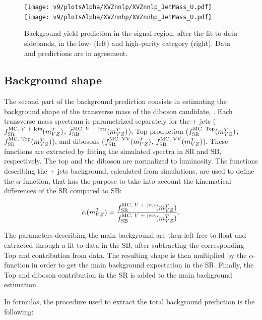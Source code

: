 \begin{figure}[!htb]
  \centering
    \texttt{[image: v9/plotsAlpha/XVZnnlp/XVZnnlp\_JetMass\_U.pdf]}
    \texttt{[image: v9/plotsAlpha/XVZnnhp/XVZnnhp\_JetMass\_U.pdf]}
  \caption{Background yield prediction in the signal region, after the fit to data sidebands, in the low- (left) and high-purity category (right). Data and predictions are in agreement.}
  \label{fig:XVZnn_JetMass}
\end{figure}








\subsection{Background shape}\label{ssec:alphaShape}

The second part of the background prediction consists in estimating the background shape of the transverse mass of the diboson candidate, \mtVZ. Each transverse mass spectrum is parametrized separately for the \V + jets ($f_{\text{SR}}^{\text{MC, \V + jets}}(\mtVZ)$, $f_{\text{SB}}^{\text{MC, \V + jets}}(\mtVZ)$), Top production ($f_{\text{SR}}^{\text{MC, Top}}(m_{VZ}^T)$, $f_{\text{SB}}^{\text{MC, Top}}(m_{VZ}^T)$), and dibosons ($f_{\text{SR}}^{\text{MC, VV}}(m_{VZ}^T)$, $f_{\text{SB}}^{\text{MC, VV}}(m_{VZ}^T)$). These functions are extracted by fitting the simulated \mtVZ spectra in SR and SB, respectively. The top and the diboson are normalized to luminosity. The functions describing the \V + jets background, calculated from simulations, are used to define the $\alpha$-function, that has the purpose to take into account the kinematical differences of the SR compared to SB:

\begin{equation}
\alpha(\mtVZ) = \frac{f_{\text{SR}}^{\text{MC, \V + jets}}(\mtVZ)}{f_{\text{SB}}^{\text{MC, \V + jets}}(\mtVZ)}.
\end{equation}

\noindent The parameters describing the main background are then left free to float and extracted through a fit to data in the SB, after subtracting the corresponding Top and \VV contribution from data. The resulting shape is then multiplied by the $\alpha$-function in order to get the main background expectation in the SR. Finally, the Top and diboson contribution in the SR is added to the main background estimation.

\noindent In formulas, the procedure used to extract the total background prediction is the following:

